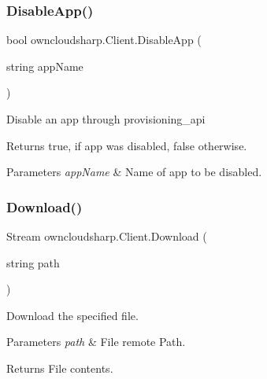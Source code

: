 \subsubsection{\texorpdfstring{Disable\+App()}{DisableApp()}}
{\footnotesize\ttfamily bool owncloudsharp.\+Client.\+Disable\+App (\begin{DoxyParamCaption}\item[{string}]{app\+Name }\end{DoxyParamCaption})}



Disable an app through provisioning\+\_\+api 

\begin{DoxyReturn}{Returns}
{\ttfamily true}, if app was disabled, {\ttfamily false} otherwise.
\end{DoxyReturn}

\begin{DoxyParams}{Parameters}
{\em app\+Name} & Name of app to be disabled.\\
\hline
\end{DoxyParams}
\mbox{\label{classowncloudsharp_1_1_client_a3a71b182537b36e924e7df1ae3bbac89}} 
\subsubsection{\texorpdfstring{Download()}{Download()}}
{\footnotesize\ttfamily Stream owncloudsharp.\+Client.\+Download (\begin{DoxyParamCaption}\item[{string}]{path }\end{DoxyParamCaption})}



Download the specified file. 


\begin{DoxyParams}{Parameters}
{\em path} & File remote Path.\\
\hline
\end{DoxyParams}
\begin{DoxyReturn}{Returns}
File contents.
\end{DoxyReturn}
\mbox{\label{classowncloudsharp_1_1_client_aa5b9f5fb73514eeee4242d57605bdcd5}} 
